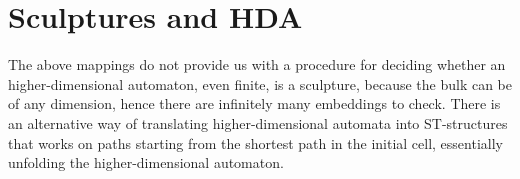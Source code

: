 \section{Sculptures and HDA}

    The above mappings do not provide us with a procedure for deciding whether an higher-dimensional automaton, even finite, is a sculpture, because the bulk can be of any dimension, hence there are infinitely many embeddings to check. There is an alternative way of translating higher-dimensional automata into ST-structures that works on paths starting from the shortest path in the initial cell, essentially unfolding the higher-dimensional automaton.

